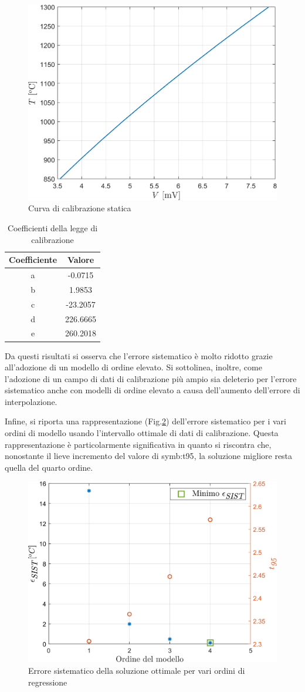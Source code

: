 \begin{figure}[H]
	\centering
	\includegraphics[width=0.4\linewidth]{"../sperimentazione nei propulsori/short_law"}
	\caption{Curva di calibrazione statica}
	\label{fig:shortlaw}
\end{figure}

\begin{table}[H]
	\centering
	\begin{tabular}{c|c}
		\toprule
		\toprule
		\textbf{Coefficiente} & \textbf{Valore} \\
		\midrule
		\midrule
		a & -0.0715		\\
		\midrule
		b & 1.9853\\
		\midrule
		c &	-23.2057 \\
		\midrule
		d & 226.6665\\
		\midrule
		e & 260.2018\\
		\bottomrule
		\bottomrule
	\end{tabular}
\caption{Coefficienti della legge di calibrazione}
\label{tab:coefficienti_short}
\end{table}


Da questi risultati si osserva che l'errore sistematico è molto ridotto grazie all'adozione di un modello di ordine elevato. Si sottolinea, inoltre, come l'adozione di un campo di dati di calibrazione più ampio sia deleterio per l'errore sistematico anche con modelli di ordine elevato a causa dell'aumento dell'errore di interpolazione. 

Infine, si riporta una rappresentazione (Fig.\ref{fig:errsistshortesempio}) dell'errore sistematico per i vari ordini di modello usando l'intervallo ottimale di dati di calibrazione. Questa rappresentazione è particolarmente significativa in quanto si riscontra che, nonostante il lieve incremento del valore di \gls{symb:t95}, la soluzione migliore resta quella del quarto ordine. 


\begin{figure} [H]
	\centering
	\includegraphics[width=0.5\linewidth]{"../sperimentazione nei propulsori/err_sist_short_best"}
\caption{Errore sistematico della soluzione ottimale per vari ordini di regressione}
	\label{fig:errsistshortesempio}
\end{figure}


